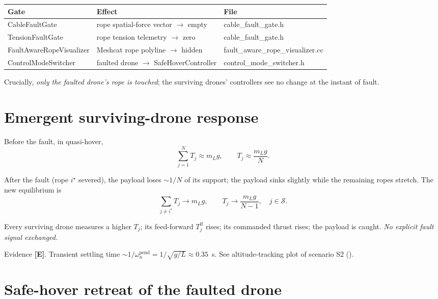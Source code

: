 \documentclass[11pt,a4paper,oneside]{report}
\newcommand{\Emp}{\textcolor{purple!60!black}{\textbf{[E]}}}
\begin{document}
\begin{longtable}{>{\ttfamily}p{} p{} >{\ttfamily}p{}}
\toprule
\textbf{Gate} & \textbf{Effect} & \textbf{File} \\
\midrule
CableFaultGate & rope spatial-force vector $\to$ empty
& cable\_fault\_gate.h \\
TensionFaultGate & rope tension telemetry $\to$ zero
& cable\_fault\_gate.h \\
FaultAwareRopeVisualizer & Meshcat rope polyline $\to$ hidden
& fault\_aware\_rope\_visualizer.cc \\
ControlModeSwitcher & faulted drone $\to$ SafeHoverController
& control\_mode\_switcher.h \\
\bottomrule
\end{longtable}

Crucially, \emph{only the faulted drone's rope is touched}; the
surviving drones' controllers see no change at the instant of fault.

\section{Emergent surviving-drone response}

Before the fault, in quasi-hover,
\begin{equation}
\sum_{j=1}^N T_j \approx m_L g, \qquad T_j\approx \frac{m_L g}{N}.
\end{equation}

After the fault (rope $i^\star$ severed), the payload loses $\sim 1/N$
of its support; the payload sinks slightly while the remaining ropes
stretch. The new equilibrium is
\begin{equation}
\sum_{j\ne i^\star} T_j \to m_L g, \qquad
T_j \to \frac{m_L g}{N-1}, \quad j\in\mathcal{S}.
\label{eq:rebalance}
\end{equation}

Every surviving drone measures a higher $T_j$; its feed-forward
$T_j^\text{ff}$ rises; its commanded thrust rises; the payload is
caught. \emph{No explicit fault signal exchanged.}

\begin{evidence}{Evidence}
\Emp. Transient settling time $\sim 1/\omega_n^\text{pend}
= 1/\sqrt{g/L}\approx 0.35$~s. See altitude-tracking plot of
scenario S2 ().
\end{evidence}

\section{Safe-hover retreat of the faulted drone}
\end{document}
